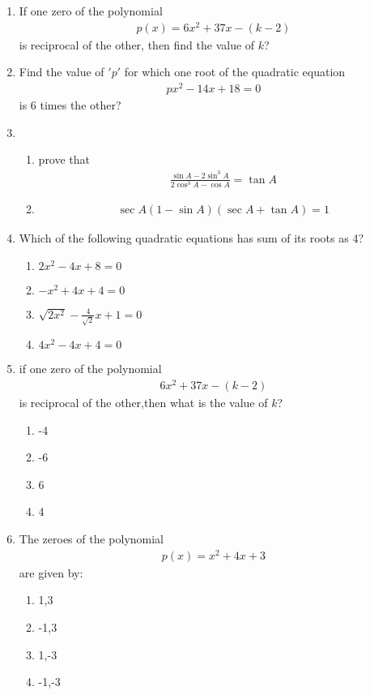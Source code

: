 \documentclass{article}
\begin{document}
\begin{enumerate}
 \item If one zero of the polynomial \begin{align} p(x)=6x^2+37x-(k-2) \end{align} is reciprocal of the other, then find the value of $k$?
 \item Find the value of $'p'$ for which one root of the quadratic equation \begin{align} px^2-14x+18=0 \end{align}is 6 times the other?
 \item 
 \begin{enumerate}
  \item prove that \begin{align} \frac{\sin A-2 \sin^3A}{2\cos^3A-\cos A}=\tan A\end{align} 
  \item \begin{align} \sec A (1-\sin A)(\sec A+\tan A)=1\end{align} 
  \end{enumerate}
  \item Which of the following  quadratic equations has sum of its roots as 4?
  \begin{enumerate}
      \item $2x^2-4x+8=0$ 
      \item $-x^2+4x+4=0$
      \item $\sqrt{2x^2}-\frac{4}{\sqrt{2}}x+1=0$ 
      \item $4x^2-4x+4=0$
   \end{enumerate}
   \item if one zero of the polynomial \begin{align} 6x^2+37x-(k-2)\end{align}  is reciprocal of the other,then what is the value of $k$?
   \begin{enumerate}
       \item -4
       \item -6
       \item 6
       \item 4
   \end{enumerate}
   \item The zeroes of the polynomial \begin{align}p(x)=x^2+4x+3\end{align}  are given by:
   \begin{enumerate}
       \item 1,3
       \item -1,3
       \item 1,-3
       \item -1,-3
   \end{enumerate}
\end{enumerate}
 
\end{document}
